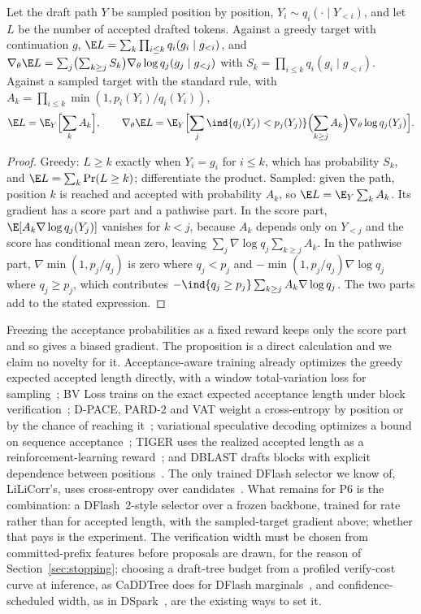 \begin{proposition}\label{prop:prefix-value}
Let the draft path $Y$ be sampled position by position, $Y_i\sim q_i(\cdot\mid Y_{<i})$, and let $L$ be the number of accepted drafted tokens. Against a greedy target with continuation $g$, $\E L=\sum_k\prod_{i\le k}q_i(g_i\mid g_{<i})$, and $\nabla_\theta\E L=\sum_j\bigl(\sum_{k\ge j}S_k\bigr)\nabla_\theta\log q_j(g_j\mid g_{<j})$ with $S_k=\prod_{i\le k}q_i(g_i\mid g_{<i})$. Against a sampled target with the standard rule, with $A_k=\prod_{i\le k}\min(1,p_i(Y_i)/q_i(Y_i))$,
\[\E L=\E_Y\Bigl[\sum_kA_k\Bigr],\qquad\nabla_\theta\E L=\E_Y\Bigl[\sum_j\ind\{q_j(Y_j)<p_j(Y_j)\}\Bigl(\sum_{k\ge j}A_k\Bigr)\nabla_\theta\log q_j(Y_j)\Bigr].\]
\end{proposition}
\begin{proof}
Greedy: $L\ge k$ exactly when $Y_i=g_i$ for $i\le k$, which has probability $S_k$, and $\E L=\sum_k\Pr(L\ge k)$; differentiate the product. Sampled: given the path, position $k$ is reached and accepted with probability $A_k$, so $\E L=\E_Y\sum_kA_k$. Its gradient has a score part and a pathwise part. In the score part, $\E[A_k\nabla\log q_j(Y_j)]$ vanishes for $k<j$, because $A_k$ depends only on $Y_{<j}$ and the score has conditional mean zero, leaving $\sum_j\nabla\log q_j\sum_{k\ge j}A_k$. In the pathwise part, $\nabla\min(1,p_j/q_j)$ is zero where $q_j<p_j$ and $-\min(1,p_j/q_j)\nabla\log q_j$ where $q_j\ge p_j$, which contributes $-\ind\{q_j\ge p_j\}\sum_{k\ge j}A_k\nabla\log q_j$. The two parts add to the stated expression.
\end{proof}
Freezing the acceptance probabilities as a fixed reward keeps only the score part and so gives a biased gradient. The proposition is a direct calculation and we claim no novelty for it. Acceptance-aware training already optimizes the greedy expected accepted length directly, with a window total-variation loss for sampling~\cite{aadt}; BV Loss trains on the exact expected acceptance length under block verification~\cite{bvloss}; D-PACE, PARD-2 and VAT weight a cross-entropy by position or by the chance of reaching it~\cite{dpace,pard2,vat}; variational speculative decoding optimizes a bound on sequence acceptance~\cite{vsd}; TIGER uses the realized accepted length as a reinforcement-learning reward~\cite{tiger}; and DBLAST drafts blocks with explicit dependence between positions~\cite{dblast}. The only trained DFlash selector we know of, LiLiCorr's, uses cross-entropy over candidates~\cite{lilicorr}. What remains for P6 is the combination: a DFlash~2-style selector over a frozen backbone, trained for rate rather than for accepted length, with the sampled-target gradient above; whether that pays is the experiment. The verification width must be chosen from committed-prefix features before proposals are drawn, for the reason of Section~\ref{sec:stopping}; choosing a draft-tree budget from a profiled verify-cost curve at inference, as CaDDTree does for DFlash marginals~\cite{caddtree}, and confidence-scheduled width, as in DSpark~\cite{dspark}, are the existing ways to set it.

